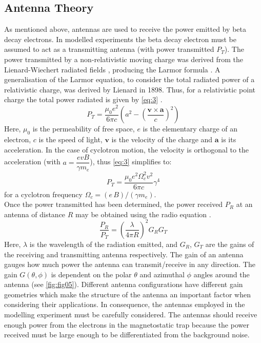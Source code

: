 \documentclass[a4paper,12pt, notitlepage]{article}
\begin{document}
\subsection{Antenna Theory} \label{antenna}
As mentioned above, antennas are used to receive the power emitted by beta decay electrons. In modelled experiments the beta decay electron must be assumed to act as a transmitting antenna (with power transmitted $P_{T}$). The power transmitted by a non-relativistic moving charge was derived from the Lienard-Wiechert radiated fields \cite{Jackson1999}, producing the Larmor formula \cite{Larmor1897-2}. A generalisation of the Larmor equation, to consider the total radiated power of a relativistic charge, was derived by Lienard in 1898. Thus, for a relativistic point charge the total power radiated is given by \cref{eq:3} \cite{Griffiths.2009}.
\begin{equation} \label{eq:3}
    P_{T} = \dfrac{\mu_{0} e^{2}}{6 \pi c} \left(a^{2} - \left(\dfrac{\boldsymbol{v} \times \boldsymbol{a}}{c}\right)^{2}\right)
\end{equation}
Here, $\mu_{0}$ is the permeability of free space, $e$ is the elementary charge of an electron, $c$ is the speed of light, $\boldsymbol{v}$ is the velocity of the charge and $\boldsymbol{a}$ is its acceleration.
In the case of cyclotron motion, the velocity is orthogonal to the acceleration (with $a = \dfrac{e v B}{\gamma m_{e}}$), thus \cref{eq:3} simplifies to: 
\begin{equation} \label{eq:4}
    P_{T} = \dfrac{\mu_{0} e^{2} \Omega_{c}^{2} v^{2}}{6 \pi c}\gamma^{4}
\end{equation}
for a cyclotron frequency $\Omega_{c} = (e\,B)/(\gamma m_{e})$. \\
Once the power transmitted has been determined, the power received $P_{R}$ at an antenna of distance $R$ may be obtained using the radio equation \cite{Visser2012}.
\begin{equation}
    \dfrac{P_{R}}{P_{T}} = \left(\dfrac{\lambda}{4 \pi R} \right)^{2} G_{R} G_{T}
\end{equation}
Here, $\lambda$ is the wavelength of the radiation emitted, and $G_{R}$, $G_{T}$ are the gains of the receiving and transmitting antenna respectively.
The gain of an antenna gauges how much power the antenna can transmit/receive in any direction. The gain $G(\theta,\phi)$ is dependent on the polar $\theta$ and azimuthal $\phi$ angles around the antenna (see \cref{fig:fig05}). Different antenna configurations have different gain geometries which make the structure of the antenna an important factor when considering their applications. In consequence, the antennas employed in the modelling experiment must be carefully considered. The antennas should receive enough power from the electrons in the magnetostatic trap because the power received must be large enough to be differentiated from the background noise. \\
\end{document}
